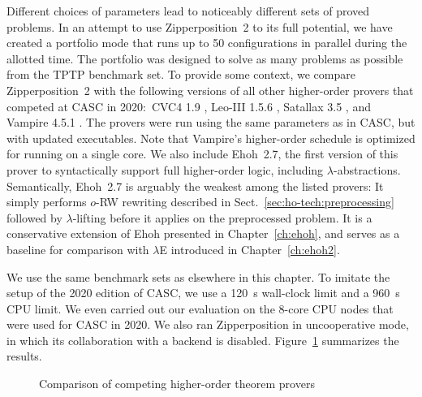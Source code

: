 Different choices of
parameters lead to noticeably different sets of proved problems. In an attempt
to use Zipperposition~2 to its full potential, we have created a portfolio mode
that runs up to 50 configurations in parallel during the allotted time. The portfolio
was designed to solve as many problems as possible from the TPTP benchmark set. To
provide some context, we compare Zipperposition~2 with the following versions of
all other higher-order provers that competed at CASC in 2020:\ CVC4 1.9
\cite{cbetal-11-cvc4}, Leo-III 1.5.6 \cite{sb-21-leo3}, Satallax 3.5
\cite{cb-2013-satallax}, and Vampire 4.5.1 \cite{br-20-full-sup-w-combs}.
The provers were run using the same parameters as in CASC, but with updated
executables.
Note that
Vampire's higher-order schedule is optimized for running on a single core.
We also include Ehoh~2.7, the first version of this prover to syntactically support
full higher-order logic, including $\lambda$-abstractions.
Semantically, Ehoh~2.7 is arguably the weakest among the listed provers:
It simply performs $o$-RW rewriting described in Sect.~\ref{sec:ho-tech:preprocessing} followed by
$\lambda$-lifting before it applies \relax{\lfsup{}} \cite{bbcw-21-lfho}
on the preprocessed problem. It is a conservative extension of Ehoh presented in Chapter~\ref{ch:ehoh},
and serves as a baseline for comparison with $\lambda$E introduced in Chapter~\ref{ch:ehoh2}.

We use the same benchmark sets as elsewhere in this chapter. To imitate the
setup of the 2020 edition of CASC, we use a 120~s wall-clock limit and a 960~s CPU limit.
We even carried out our evaluation on the 8-core CPU nodes that were used for
CASC in 2020. We also ran Zipperposition in uncooperative mode, in which its
collaboration with a backend is disabled. Figure~\ref{fig:other-provers}
summarizes the results.

\begin{figure}[t]
  \centering
  \def\arraystretch{1.1}%
  \caption{Comparison of competing higher-order theorem provers}
  \label{fig:other-provers}
\end{figure}

